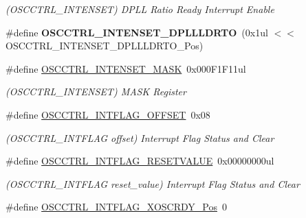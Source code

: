 \begin{DoxyCompactItemize}
\begin{DoxyCompactList}\small\item\em (O\+S\+C\+C\+T\+R\+L\+\_\+\+I\+N\+T\+E\+N\+S\+E\+T) D\+P\+L\+L Ratio Ready Interrupt Enable \end{DoxyCompactList}\item 
\hypertarget{group___s_a_m_l21___o_s_c_c_t_r_l_ga6f2caf4c2de668cf18fc230a684e5ec6}{}\#define {\bfseries O\+S\+C\+C\+T\+R\+L\+\_\+\+I\+N\+T\+E\+N\+S\+E\+T\+\_\+\+D\+P\+L\+L\+L\+D\+R\+T\+O}~(0x1ul $<$$<$ O\+S\+C\+C\+T\+R\+L\+\_\+\+I\+N\+T\+E\+N\+S\+E\+T\+\_\+\+D\+P\+L\+L\+L\+D\+R\+T\+O\+\_\+\+Pos)\label{group___s_a_m_l21___o_s_c_c_t_r_l_ga6f2caf4c2de668cf18fc230a684e5ec6}

\item 
\hypertarget{group___s_a_m_l21___o_s_c_c_t_r_l_ga58580ac326b8ea2f4f59a3f12a9baae3}{}\#define \hyperlink{group___s_a_m_l21___o_s_c_c_t_r_l_ga58580ac326b8ea2f4f59a3f12a9baae3}{O\+S\+C\+C\+T\+R\+L\+\_\+\+I\+N\+T\+E\+N\+S\+E\+T\+\_\+\+M\+A\+S\+K}~0x000\+F1\+F11ul\label{group___s_a_m_l21___o_s_c_c_t_r_l_ga58580ac326b8ea2f4f59a3f12a9baae3}

\begin{DoxyCompactList}\small\item\em (O\+S\+C\+C\+T\+R\+L\+\_\+\+I\+N\+T\+E\+N\+S\+E\+T) M\+A\+S\+K Register \end{DoxyCompactList}\item 
\hypertarget{group___s_a_m_l21___o_s_c_c_t_r_l_gad4379aa6be2f266b44248cf95b73bbc2}{}\#define \hyperlink{group___s_a_m_l21___o_s_c_c_t_r_l_gad4379aa6be2f266b44248cf95b73bbc2}{O\+S\+C\+C\+T\+R\+L\+\_\+\+I\+N\+T\+F\+L\+A\+G\+\_\+\+O\+F\+F\+S\+E\+T}~0x08\label{group___s_a_m_l21___o_s_c_c_t_r_l_gad4379aa6be2f266b44248cf95b73bbc2}

\begin{DoxyCompactList}\small\item\em (O\+S\+C\+C\+T\+R\+L\+\_\+\+I\+N\+T\+F\+L\+A\+G offset) Interrupt Flag Status and Clear \end{DoxyCompactList}\item 
\hypertarget{group___s_a_m_l21___o_s_c_c_t_r_l_gaf36ade32e3a82aa932c61c67dd1051d2}{}\#define \hyperlink{group___s_a_m_l21___o_s_c_c_t_r_l_gaf36ade32e3a82aa932c61c67dd1051d2}{O\+S\+C\+C\+T\+R\+L\+\_\+\+I\+N\+T\+F\+L\+A\+G\+\_\+\+R\+E\+S\+E\+T\+V\+A\+L\+U\+E}~0x00000000ul\label{group___s_a_m_l21___o_s_c_c_t_r_l_gaf36ade32e3a82aa932c61c67dd1051d2}

\begin{DoxyCompactList}\small\item\em (O\+S\+C\+C\+T\+R\+L\+\_\+\+I\+N\+T\+F\+L\+A\+G reset\+\_\+value) Interrupt Flag Status and Clear \end{DoxyCompactList}\item 
\hypertarget{group___s_a_m_l21___o_s_c_c_t_r_l_ga1c522599d8b45dd46183b68afb7c4179}{}\#define \hyperlink{group___s_a_m_l21___o_s_c_c_t_r_l_ga1c522599d8b45dd46183b68afb7c4179}{O\+S\+C\+C\+T\+R\+L\+\_\+\+I\+N\+T\+F\+L\+A\+G\+\_\+\+X\+O\+S\+C\+R\+D\+Y\+\_\+\+Pos}~0\label{group___s_a_m_l21___o_s_c_c_t_r_l_ga1c522599d8b45dd46183b68afb7c4179}


\end{DoxyCompactItemize}
